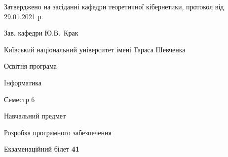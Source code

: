 \documentclass[10pt, ukrainian]{article}
\begin{document}
{\vspace{5mm}\smallskip \begin {small} Затверджено на засіданні кафедри теоретичної кібернетики, протокол  від   29.01.2021 р.\par\smallskip\smallskip
{\parbox {6.5 cm}{Зав. кафедри \dotfill Ю.В.~Крак}} \end{small}}
\newpage

{{\begin {small}\par
{ \center  Київський національний університет імені Тараса Шевченка \par}
{\parbox {5 cm}{Освітня програма \hfill}{\parbox {7 cm}{Інформатика \hfill}}\parbox {6 cm}{\hfill Семестр 6}}\par
{\parbox {5 cm} {Навчальний предмет \hfill}\parbox {7 cm}{Розробка програмного забезпечення \hfill}\parbox {6cm}{\hfill}\par}\vspace{-7pt} \end{small}}{\center Екзаменаційний білет \No \textbf
{ 41 }\par}}
\end{document}
